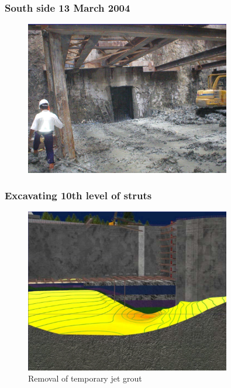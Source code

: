 \documentclass[notes]{beamer}
\begin{document}
\begin{frame}
\frametitle{South side 13 March 2004}
\begin{figure}[ht]
	\centering
	\includegraphics[width=0.8\textwidth]{figs/south-side-14march04.png}
\end{figure}
\end{frame}

\begin{frame}
\frametitle{Excavating 10th level of struts}
\begin{figure}[ht]
	\centering
	\includegraphics[width=0.8\textwidth]{figs/excavation-10-struts-jgp.png}
	\caption*{Removal of temporary jet grout}
\end{figure}
\end{frame}
\end{document}
